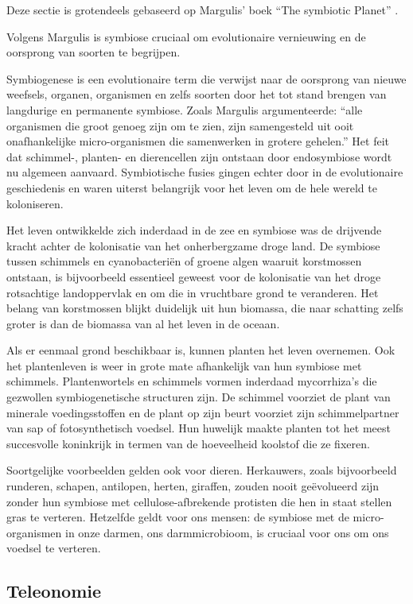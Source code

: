 \documentclass[
  11pt,
]{book}
\begin{document}
Deze sectie is grotendeels gebaseerd op Margulis' boek ``The symbiotic Planet'' \citep{margulis1999}.

Volgens Margulis is symbiose cruciaal om evolutionaire vernieuwing en de oorsprong van soorten te begrijpen.

Symbiogenese is een evolutionaire term die verwijst naar de oorsprong van nieuwe weefsels, organen, organismen en zelfs soorten door het tot stand brengen van langdurige en permanente symbiose. Zoals Margulis argumenteerde: ``alle organismen die groot genoeg zijn om te zien, zijn samengesteld uit ooit onafhankelijke micro-organismen die samenwerken in grotere gehelen.'' Het feit dat schimmel-, planten- en dierencellen zijn ontstaan door endosymbiose wordt nu algemeen aanvaard. Symbiotische fusies gingen echter door in de evolutionaire geschiedenis en waren uiterst belangrijk voor het leven om de hele wereld te koloniseren.

Het leven ontwikkelde zich inderdaad in de zee en symbiose was de drijvende kracht achter de kolonisatie van het onherbergzame droge land. De symbiose tussen schimmels en cyanobacteriën of groene algen waaruit korstmossen ontstaan, is bijvoorbeeld essentieel geweest voor de kolonisatie van het droge rotsachtige landoppervlak en om die in vruchtbare grond te veranderen. Het belang van korstmossen blijkt duidelijk uit hun biomassa, die naar schatting zelfs groter is dan de biomassa van al het leven in de oceaan.

Als er eenmaal grond beschikbaar is, kunnen planten het leven overnemen. Ook het plantenleven is weer in grote mate afhankelijk van hun symbiose met schimmels. Plantenwortels en schimmels vormen inderdaad mycorrhiza's die gezwollen symbiogenetische structuren zijn. De schimmel voorziet de plant van minerale voedingsstoffen en de plant op zijn beurt voorziet zijn schimmelpartner van sap of fotosynthetisch voedsel. Hun huwelijk maakte planten tot het meest succesvolle koninkrijk in termen van de hoeveelheid koolstof die ze fixeren.

Soortgelijke voorbeelden gelden ook voor dieren. Herkauwers, zoals bijvoorbeeld runderen, schapen, antilopen, herten, giraffen, zouden nooit geëvolueerd zijn zonder hun symbiose met cellulose-afbrekende protisten die hen in staat stellen gras te verteren. Hetzelfde geldt voor ons mensen: de symbiose met de micro-organismen in onze darmen, ons darmmicrobioom, is cruciaal voor ons om ons voedsel te verteren.

\hypertarget{teleonomie}{%
\subsection{Teleonomie}\label{teleonomie}}
\end{document}
